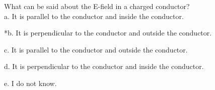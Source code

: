 
What can be said about the E-field in a charged conductor?\\

a. It is parallel to the conductor and inside the conductor.

*b. It is perpendicular to the conductor and outside the conductor.

c. It is parallel to the conductor and outside the conductor.

d. It is perpendicular to the conductor and inside the conductor.

e. I do not know.\\
